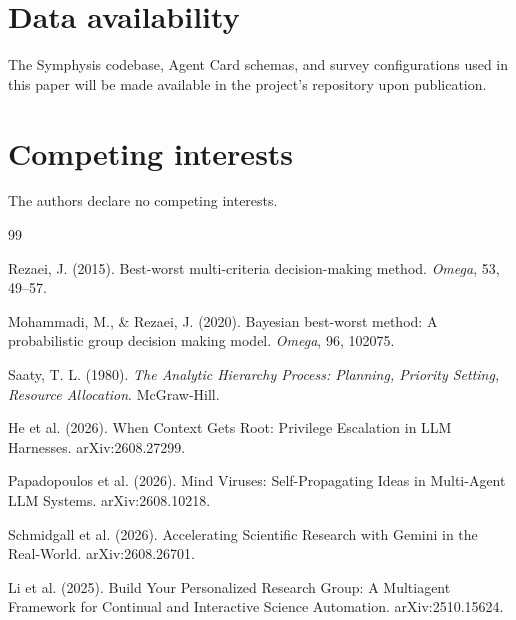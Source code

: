 \documentclass[11pt]{article}
\begin{document}
\section*{Data availability}
The Symphysis codebase, Agent Card schemas, and survey configurations
used in this paper will be made available in the project's repository
upon publication.

\section*{Competing interests}
The authors declare no competing interests.

\begin{thebibliography}{99}

Rezaei, J. (2015). Best-worst multi-criteria decision-making method.
\emph{Omega}, 53, 49--57.

Mohammadi, M., \& Rezaei, J. (2020). Bayesian best-worst method:
A probabilistic group decision making model. \emph{Omega}, 96, 102075.

Saaty, T. L. (1980). \emph{The Analytic Hierarchy Process: Planning,
Priority Setting, Resource Allocation}. McGraw-Hill.

He et al. (2026). When Context Gets Root: Privilege Escalation in LLM
Harnesses. arXiv:2608.27299.

Papadopoulos et al. (2026). Mind Viruses: Self-Propagating Ideas in
Multi-Agent LLM Systems. arXiv:2608.10218.

Schmidgall et al. (2026). Accelerating Scientific Research with Gemini
in the Real-World. arXiv:2608.26701.

Li et al. (2025). Build Your Personalized Research Group: A Multiagent
Framework for Continual and Interactive Science Automation.
arXiv:2510.15624.

\end{thebibliography}
\end{document}
